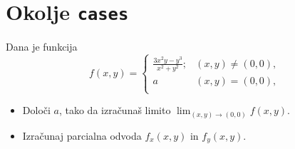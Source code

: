 \documentclass[a4paper,12pt]{article}
\begin{document}
\section*{Okolje \texttt{cases}}
Dana je funkcija
\[
  f(x , y) =
  \begin{cases}
    \frac{3x^2y-y^3}{x^2+y^2}; & (x , y)\neq (0 , 0), \\
     a & (x , y)=(0 , 0), \\
  \end{cases}
\]
\begin{itemize}
\item Določi \(a\), tako da izračunaš limito \( \lim_{(x,y)\to(0,0)} f(x,y) \).
\item Izračunaj parcialna odvoda \(f_x(x,y)\) in \(f_y(x,y)\).
\end{itemize}
\end{document}

